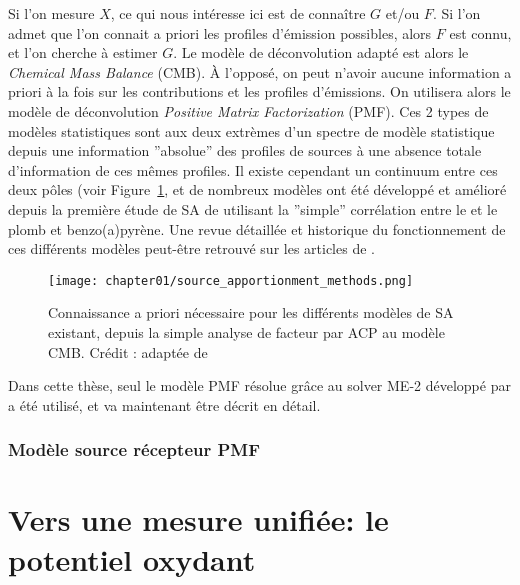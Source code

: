 Si l'on mesure $X$, ce qui nous intéresse ici est de connaître $G$ et/ou $F$. Si l'on
admet que l'on connait a priori les profiles d'émission possibles, alors $F$ est connu, et
l'on cherche à estimer $G$. Le modèle de déconvolution adapté est alors le
\textit{Chemical Mass Balance} (CMB). À l'opposé, on peut n'avoir aucune information a
priori à la fois sur les contributions et les profiles d'émissions. On utilisera alors le
modèle de déconvolution \textit{Positive Matrix Factorization} (PMF).  Ces 2 types de
modèles statistiques sont aux deux extrèmes d'un spectre de modèle statistique depuis une
information ''absolue'' des profiles de sources à une absence totale d'information de ces
mêmes profiles.  Il existe cependant un continuum entre ces deux pôles (voir
Figure~\ref{fig:chapter01/source_apportionment_methods}, et de nombreux modèles ont été
développé et amélioré depuis la première étude de SA de \textcite{colucciAutomotive1965}
utilisant la ''simple'' corrélation entre le  et le plomb et benzo(a)pyrène.  Une
revue détaillée et historique du fonctionnement de ces différents modèles peut-être
retrouvé sur les articles de
\textcite{henryHistory1997,vianaSource2008,belisCritical2013,hopkeReview2016}.

\begin{figure}[ht]
    \centering
    \texttt{[image: chapter01/source\_apportionment\_methods.png]}
    \caption{
        Connaissance a priori nécessaire pour les différents modèles de SA existant,
        depuis la simple analyse de facteur par ACP au modèle CMB. Crédit :
        \textcite{vianaSource2008} adaptée de \textcite{schauerCharacterization2006}
    }%
    \label{fig:chapter01/source_apportionment_methods}
\end{figure}

Dans cette thèse, seul le modèle PMF résolue grâce au solver ME-2 développé par
\textcite{paateroMultilinear1999} a été utilisé, et va maintenant être décrit en détail.

\subsubsection{Modèle source récepteur PMF}%
\label{ssub:pmf}


\section{Vers une mesure unifiée: le potentiel oxydant}%
\label{sec:le_potentiel_oxydant_des_aerosols}

